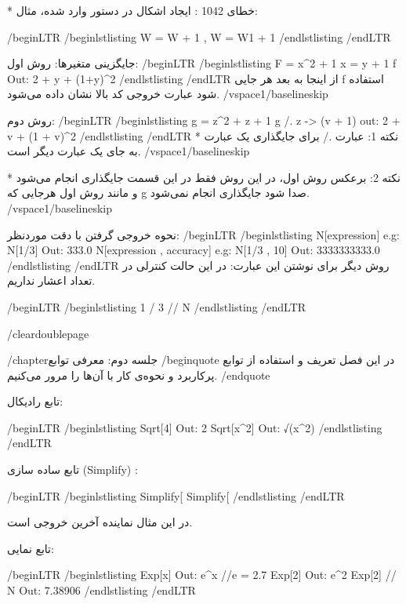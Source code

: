 * خطای 1042 : ایجاد اشکال در دستور وارد شده، مثال:

/begin{LTR}
/begin{lstlisting}
W = W + 1   ,  W = W1 + 1
/end{lstlisting}
/end{LTR}

جایگزینی متغیر‌ها:
روش اول:
/begin{LTR}
/begin{lstlisting}
F = x^2 + 1
x = y + 1
f           Out: 2 + y + (1+y)^2
/end{lstlisting}
/end{LTR}
از اینجا به بعد هر جایی f استفاده شود عبارت خروجی کد بالا نشان داده می‌شود.
/vspace{1/baselineskip} 

روش دوم:
/begin{LTR}
/begin{lstlisting}
g = z^2 + z + 1
g /. z -> (v + 1)             out: 2 + v + (1 + v)^2
/end{lstlisting}
/end{LTR}
* نکته 1: عبارت ./ برای جایگذاری یک عبارت به جای یک عبارت دیگر است.
/vspace{1/baselineskip} 

* نکته 2: برعکس روش اول، در این روش فقط در این قسمت جایگذاری انجام می‌شود و مانند روش اول هرجایی که g صدا شود جایگذاری انجام نمی‌شود.
/vspace{1/baselineskip} 

نحوه خروجی گرفتن با دقت موردنظر:
/begin{LTR}
/begin{lstlisting}
N[expression]                         e.g: N[1/3]        Out: 333.0
N[expression , accuracy]       e.g: N[1/3 , 10]        Out: 3333333333.0
/end{lstlisting}
/end{LTR}
روش دیگر برای نوشتن این عبارت: در این حالت کنترلی در تعداد اعشار نداریم.

/begin{LTR}
/begin{lstlisting}
1 / 3 // N
/end{lstlisting}
/end{LTR}

/cleardoublepage

/chapter{جلسه دوم: معرفی توابع}
/begin{quote}
در این فصل تعریف و استفاده از توابع پرکاربرد و نحوه‌ی کار با آن‌ها را مرور می‌کنیم.
/end{quote}



تابع رادیکال:

/begin{LTR}
/begin{lstlisting}
Sqrt[4]                Out: 2
Sqrt[x^2]             Out: √(x^2)
/end{lstlisting}
/end{LTR}

تابع ساده سازی (Simplify) :

/begin{LTR}
/begin{lstlisting}
Simplify[%
Simplify[%
/end{lstlisting}
/end{LTR}

در این مثال نماینده آخرین خروجی است.

تابع نمایی:

/begin{LTR}
/begin{lstlisting}
Exp[x]                            Out: e^x                                      //e = 2.7
Exp[2]                            Out: e^2
Exp[2] // N                    Out: 7.38906
/end{lstlisting}
/end{LTR}

